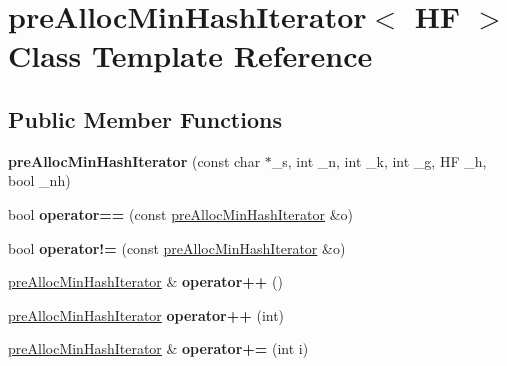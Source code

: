 \hypertarget{classpreAllocMinHashIterator}{}\section{pre\+Alloc\+Min\+Hash\+Iterator$<$ HF $>$ Class Template Reference}
\label{classpreAllocMinHashIterator}
\subsection*{Public Member Functions}
\begin{DoxyCompactItemize}
\item 
\mbox{\label{classpreAllocMinHashIterator_a8838a833fdf7f555f5e71990d6f225e4}} 
{\bfseries pre\+Alloc\+Min\+Hash\+Iterator} (const char $\ast$\+\_\+s, int \+\_\+n, int \+\_\+k, int \+\_\+g, HF \+\_\+h, bool \+\_\+nh)
\item 
\mbox{\label{classpreAllocMinHashIterator_a991161d50ddfb0e043e41f0089666d71}} 
bool {\bfseries operator==} (const \hyperlink{classpreAllocMinHashIterator}{pre\+Alloc\+Min\+Hash\+Iterator} \&o)
\item 
\mbox{\label{classpreAllocMinHashIterator_af0d9c396afa35e08fb4b445a39655dbe}} 
bool {\bfseries operator!=} (const \hyperlink{classpreAllocMinHashIterator}{pre\+Alloc\+Min\+Hash\+Iterator} \&o)
\item 
\mbox{\label{classpreAllocMinHashIterator_abd1b5b6dc989dbc071f830394005dd86}} 
\hyperlink{classpreAllocMinHashIterator}{pre\+Alloc\+Min\+Hash\+Iterator} \& {\bfseries operator++} ()
\item 
\mbox{\label{classpreAllocMinHashIterator_a236e5211925167865f53761894cf0cf8}} 
\hyperlink{classpreAllocMinHashIterator}{pre\+Alloc\+Min\+Hash\+Iterator} {\bfseries operator++} (int)
\item 
\mbox{\label{classpreAllocMinHashIterator_ae476eaa136118335375c6edc4064cf31}} 
\hyperlink{classpreAllocMinHashIterator}{pre\+Alloc\+Min\+Hash\+Iterator} \& {\bfseries operator+=} (int i)
\item 

\end{DoxyCompactItemize}
